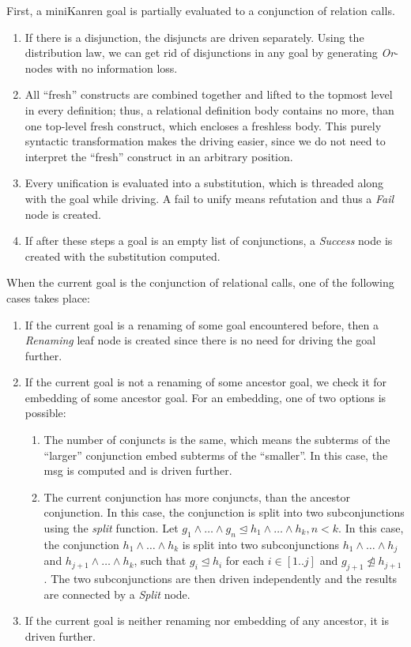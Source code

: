 \documentclass{llncs}
\begin{document}
First, a miniKanren goal is partially evaluated to a conjunction of relation calls.

\begin{enumerate}
  \item If there is a disjunction, the disjuncts are driven separately. Using the distribution law, we can get rid of disjunctions in any goal by generating \emph{Or}-nodes with no information loss. 
  \item All ``fresh'' constructs are combined together and lifted to the topmost level in every definition; thus, a relational definition body contains no more, than one top-level fresh construct, which encloses a freshless body. This purely syntactic transformation makes the driving easier, since we do not need to interpret the ``fresh'' construct in an arbitrary position. 
  \item Every unification is evaluated into a substitution, which is threaded along with the goal while driving. A fail to unify means refutation and thus a \emph{Fail} node is created. 
  \item If after these steps a goal is an empty list of conjunctions, a \emph{Success} node is created with the substitution computed. 
\end{enumerate}

When the current goal is the conjunction of relational calls, one of the following cases takes place:

\begin{enumerate}
  \item If the current goal is a renaming of some goal encountered before, then a \emph{Renaming} leaf node is created since there is no need for driving the goal further. 
  \item If the current goal is not a renaming of some ancestor goal, we check it for embedding of some ancestor goal. For an embedding, one of two options is possible:
  \begin{enumerate}
    \item The number of conjuncts is the same, which means the subterms of the ``larger'' conjunction embed subterms of the ``smaller''. In this case, the msg is computed and is driven further. 
    \item The current conjunction has more conjuncts, than the ancestor conjunction. In this case, the conjunction is split into two subconjunctions using the \emph{split} function. Let $g_1 \wedge \dots \wedge g_n \trianglelefteq h_1 \wedge \dots \wedge h_k, n < k$. In this case, the conjunction $h_1 \wedge \dots \wedge h_k$ is split into two subconjunctions $h_1 \wedge \dots \wedge h_j$ and $h_{j+1} \wedge \dots \wedge h_k$, such that $g_i \trianglelefteq h_i$ for each $i \in [1..j]$ and $g_{j+1} \ntrianglelefteq h_{j+1}$. The two subconjunctions are then driven independently and the results are connected by a \emph{Split} node. 
  \end{enumerate}     
  \item If the current goal is neither renaming nor embedding of any ancestor, it is driven further. 
\end{enumerate}
\end{document}
